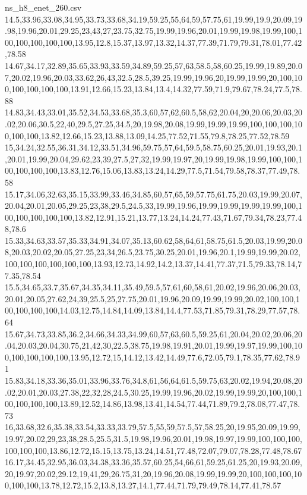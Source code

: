 \begin{filecontents*}[overwrite]{ns_h8_enet_260.csv}
14.5,33.96,33.08,34.95,33.73,33.68,34.19,59.25,55,64,59,57.75,61,19.99,19.9,20.09,19.98,19.96,20.01,29.25,23,43,27,23.75,32.75,19.99,19.96,20.01,19.99,19.98,19.99,100,100,100,100,100,100,13.95,12.8,15.37,13.97,13.32,14.37,77.39,71.79,79.31,78.01,77.42,78.58
14.67,34.17,32.89,35.65,33.93,33.59,34.89,59.25,57,63,58.5,58,60.25,19.99,19.89,20.07,20.02,19.96,20.03,33.62,26,43,32.5,28.5,39.25,19.99,19.96,20,19.99,19.99,20,100,100,100,100,100,100,13.91,12.66,15.23,13.84,13.4,14.32,77.59,71.9,79.67,78.24,77.5,78.88
14.83,34.43,33.01,35.52,34.53,33.68,35.3,60,57,62,60.5,58,62,20.04,20,20.06,20.03,20.02,20.06,30.5,22,40,29.5,27.25,34.5,20,19.98,20.08,19.99,19.99,19.99,100,100,100,100,100,100,13.82,12.66,15.23,13.88,13.09,14.25,77.52,71.55,79.8,78.25,77.52,78.59
15,34.24,32.55,36.31,34.12,33.51,34.96,59.75,57,64,59.5,58.75,60.25,20.01,19.93,20.1,20.01,19.99,20.04,29.62,23,39,27.5,27,32,19.99,19.97,20,19.99,19.98,19.99,100,100,100,100,100,100,13.83,12.76,15.06,13.83,13.24,14.29,77.5,71.54,79.58,78.37,77.49,78.58
15.17,34.06,32.63,35.15,33.99,33.46,34.85,60,57,65,59,57.75,61.75,20.03,19.99,20.07,20.04,20.01,20.05,29.25,23,38,29.5,24.5,33,19.99,19.96,19.99,19.99,19.99,19.99,100,100,100,100,100,100,13.82,12.91,15.21,13.77,13.24,14.24,77.43,71.67,79.34,78.23,77.48,78.6
15.33,34.63,33.57,35.33,34.91,34.07,35.13,60.62,58,64,61,58.75,61.5,20.03,19.99,20.08,20.03,20.02,20.05,27.25,23,34,26.5,23.75,30.25,20.01,19.96,20.1,19.99,19.99,20.02,100,100,100,100,100,100,13.93,12.73,14.92,14.2,13.37,14.41,77.37,71.5,79.33,78.14,77.35,78.54
15.5,34.65,33.7,35.67,34.35,34.11,35.49,59.5,57,61,60,58,61,20.02,19.96,20.06,20.03,20.01,20.05,27.62,24,39,25.5,25,27.75,20.01,19.96,20.09,19.99,19.99,20.02,100,100,100,100,100,100,14.03,12.75,14.84,14.09,13.84,14.4,77.53,71.85,79.31,78.29,77.57,78.64
15.67,34.73,33.85,36.2,34.66,34.33,34.99,60,57,63,60.5,59.25,61,20.04,20.02,20.06,20.04,20.03,20.04,30.75,21,42,30,22.5,38.75,19.98,19.91,20.01,19.99,19.97,19.99,100,100,100,100,100,100,13.95,12.72,15,14.12,13.42,14.49,77.6,72.05,79.1,78.35,77.62,78.91
15.83,34.18,33.36,35.01,33.96,33.76,34.8,61,56,64,61.5,59.75,63,20.02,19.94,20.08,20.02,20.01,20.03,27.38,22,32,28,24.5,30.25,19.99,19.96,20.02,19.99,19.99,20,100,100,100,100,100,100,13.89,12.52,14.86,13.98,13.41,14.54,77.44,71.89,79.2,78.08,77.47,78.73
16,33.68,32.6,35.38,33.54,33.33,33.79,57.5,55,59,57.5,57,58.25,20,19.95,20.09,19.99,19.97,20.02,29,23,38,28.5,25.5,31.5,19.98,19.96,20.01,19.98,19.97,19.99,100,100,100,100,100,100,13.86,12.72,15.15,13.75,13.24,14.51,77.48,72.07,79.07,78.28,77.48,78.67
16.17,34.45,32.95,36.03,34.38,33.36,35.57,60.25,54,66,61,59.25,61.25,20,19.93,20.09,20,19.97,20.02,29.12,19,41,29,26.75,31,20,19.96,20.08,19.99,19.99,20,100,100,100,100,100,100,13.78,12.72,15.2,13.8,13.27,14.1,77.44,71.79,79.49,78.14,77.41,78.57

\end{filecontents*}
